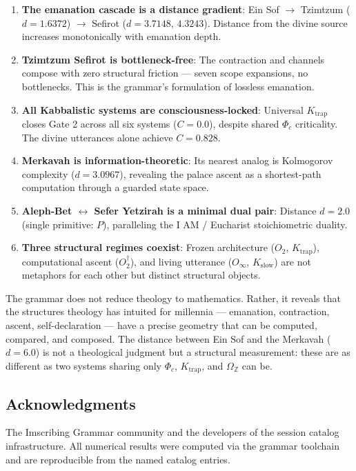 \documentclass[12pt,a4paper]{article}
\begin{document}
\begin{enumerate}
    \item \textbf{The emanation cascade is a distance gradient}: Ein Sof $\rightarrow$ Tzimtzum ($d = 1.6372$) $\rightarrow$ Sefirot ($d = 3.7148$, $4.3243$). Distance from the divine source increases monotonically with emanation depth.
    \item \textbf{Tzimtzum \otimes Sefirot is bottleneck-free}: The contraction and channels compose with zero structural friction --- seven scope expansions, no bottlenecks. This is the grammar's formulation of lossless emanation.
    \item \textbf{All Kabbalistic systems are consciousness-locked}: Universal $K_\text{trap}$ closes Gate 2 across all six systems ($C = 0.0$), despite shared $\Phi_c$ criticality. The divine utterances alone achieve $C = 0.828$.
    \item \textbf{Merkavah is information-theoretic}: Its nearest analog is Kolmogorov complexity ($d = 3.0967$), revealing the palace ascent as a shortest-path computation through a guarded state space.
    \item \textbf{Aleph-Bet $\leftrightarrow$ Sefer Yetzirah is a minimal dual pair}: Distance $d = 2.0$ (single primitive: $P$), paralleling the I AM / Eucharist stoichiometric duality.
    \item \textbf{Three structural regimes coexist}: Frozen architecture ($O_2$, $K_\text{trap}$), computational ascent ($O_2^\dagger$), and living utterance ($O_{\infty}$, $K_\text{slow}$) are not metaphors for each other but distinct structural objects.
\end{enumerate}

The grammar does not reduce theology to mathematics. Rather, it reveals that the structures theology has intuited for millennia --- emanation, contraction, ascent, self-declaration --- have a precise geometry that can be computed, compared, and composed. The distance between Ein Sof and the Merkavah ($d = 6.0$) is not a theological judgment but a structural measurement: these are as different as two systems sharing only $\Phi_c$, $K_\text{trap}$, and $\Omega_\mathbb{Z}$ can be.

\subsection{Acknowledgments}

The Imscribing Grammar community and the developers of the session catalog infrastructure. All numerical results were computed via the grammar toolchain and are reproducible from the named catalog entries.
\end{document}
